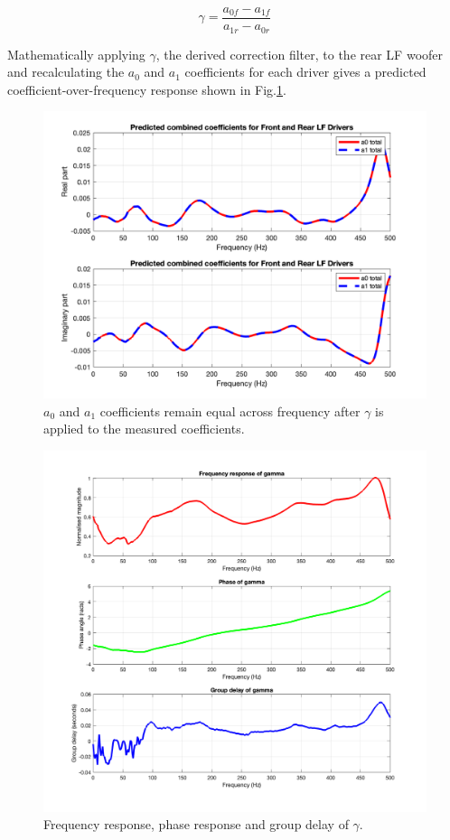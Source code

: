 \documentclass{report}
\begin{document}
            \begin{equation}
                \gamma = \frac{a_{0f} - a_{1f}}{a_{1r} - a_{0r}}
                \label{gammaAlgebra}
            \end{equation}

            Mathematically applying $\gamma$, the derived correction filter, to the rear LF woofer and recalculating the $a_0$ and $a_1$ coefficients for each driver gives a predicted coefficient-over-frequency response shown in Fig.\ref{coeffsPredicted}.

            \begin{figure}[H]
                \centering
                \includegraphics[scale=0.35]{figs/coeffsPredicted.png}%
                \caption{$a_0$ and $a_1$ coefficients remain equal across frequency after $\gamma$ is applied to the measured coefficients.}
                \label{coeffsPredicted}
            \end{figure}

            \begin{figure}[H]
                \centering
                \includegraphics[width = 0.75\linewidth]{figs/grpDelay.png}%
                \caption{Frequency response, phase response and group delay of $\gamma$.}
                \label{grpDelay}
            \end{figure}
\end{document}
